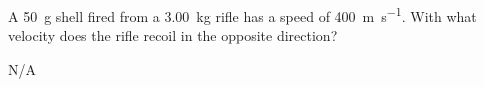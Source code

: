 \begin{question}[ID=impulse-C-Q04,topic=impulse,difficulty=C]
    A \SI{50}{\gram} shell fired from a \SI{3.00}{\kilo\gram} rifle
        has a speed of \SI{400}{\meter\per\second}.
    With what velocity does the rifle recoil in the opposite direction?
\end{question}
\begin{solution}
    N/A
\end{solution}


\endinput

